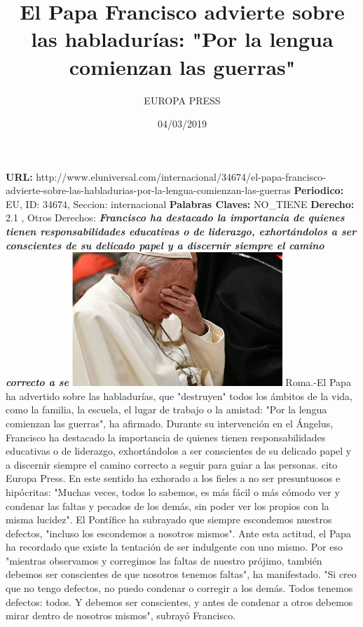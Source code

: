 \documentclass{article}%
\title{\textbf{El Papa Francisco advierte sobre las habladurías: "Por la lengua comienzan las guerras"}}%
\author{EUROPA PRESS}%
\date{04/03/2019}%
\begin{document}
%
\normalsize%
\maketitle%
\textbf{URL: }%
http://www.eluniversal.com/internacional/34674/el{-}papa{-}francisco{-}advierte{-}sobre{-}las{-}habladurias{-}por{-}la{-}lengua{-}comienzan{-}las{-}guerras\newline%
%
\textbf{Periodico: }%
EU, %
ID: %
34674, %
Seccion: %
internacional\newline%
%
\textbf{Palabras Claves: }%
NO\_TIENE\newline%
%
\textbf{Derecho: }%
2.1%
, Otros Derechos: %
\newline%
%
\textbf{\textit{Francisco ha destacado la importancia de quienes tienen responsabilidades educativas o de liderazgo, exhortándolos a ser conscientes de su delicado papel y a discernir siempre el camino correcto a se}}%
\newline%
\newline%
%
\includegraphics[width=300px]{EU_34674.jpg}%
\newline%
%
Roma.{-}El Papa ha advertido sobre las habladurías, que "destruyen" todos los ámbitos de la vida, como la familia, la escuela, el lugar de trabajo o la amistad: "Por la lengua comienzan las guerras", ha afirmado.%
\newline%
%
Durante su intervención en el Ángelus, Francisco ha destacado la importancia de quienes tienen responsabilidades educativas o de liderazgo, exhortándolos a ser conscientes de su delicado papel y a discernir siempre el camino correcto a seguir para guiar a las personas. cito Europa Press.%
\newline%
%
En este sentido ha exhorado a los fieles a no ser presuntuosos e hipócritas: "Muchas veces, todos lo sabemos, es más fácil o más cómodo ver y condenar las faltas y pecados de los demás, sin poder ver los propios con la misma lucidez".%
\newline%
%
El Pontífice ha subrayado que siempre escondemos nuestros defectos, "incluso los escondemos a nosotros mismos".%
\newline%
%
Ante esta actitud, el Papa ha recordado que existe la tentación de ser indulgente con uno mismo. Por eso "mientras observamos y corregimos las faltas de nuestro prójimo, también debemos ser conscientes de que nosotros tenemos faltas", ha manifestado.%
\newline%
%
"Si creo que no tengo defectos, no puedo condenar o corregir a los demás. Todos tenemos defectos: todos. Y debemos ser conscientes, y antes de condenar a otros debemos mirar dentro de nosotros mismos", subrayó Francisco.%
\newline%
%
\end{document}
